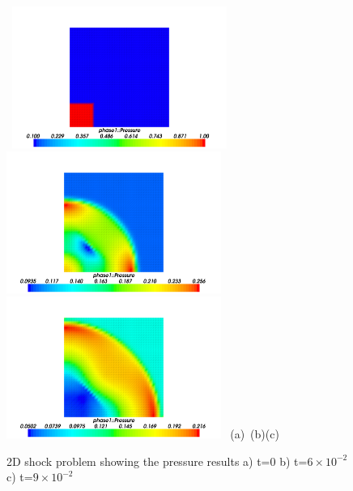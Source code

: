 




\begin{figure}[H]
\vbox{
\hbox{
\hspace{-1.cm}
\includegraphics[width=7.0cm]{./doc_figures/shock/2d-shock-p0}
\hspace{-1.cm}
\includegraphics[width=7.0cm]{./doc_figures/shock/2d-shock-p60}
\hspace{-1.cm}
\includegraphics[width=7.0cm]{./doc_figures/shock/2d-shock-p90}
}
\vspace{-0.cm}
\hbox{\hspace{4.cm}(a) \hspace{4.5cm}(b)\hspace{4.5cm}(c)}
\vspace{-0.cm}}
\label{2d-pressure-mesh}
\caption{ 2D shock problem showing the pressure results a) 
t=0 b) t=$6\times 10^{-2}$ c) t=$9\times 10^{-2}$ }
\end{figure}

